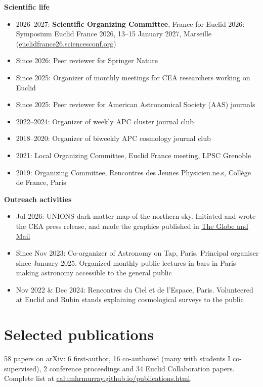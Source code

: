 \documentclass[11pt]{article}
\begin{document}
\textbf{Scientific life}
\begin{itemize}[leftmargin=1.5em, itemsep=0.2em]
\item 2026--2027: \textbf{Scientific Organizing Committee}, France for Euclid 2026: Symposium Euclid France 2026, 13--15 January 2027, Marseille (\href{https://euclidfrance26.sciencesconf.org/}{euclidfrance26.sciencesconf.org})
\item Since 2026: Peer reviewer for Springer Nature
\item Since 2025: Organizer of monthly meetings for CEA researchers working on Euclid
\item Since 2025: Peer reviewer for American Astronomical Society (AAS) journals
\item 2022--2024: Organizer of weekly APC cluster journal club
\item 2018--2020: Organizer of biweekly APC cosmology journal club
\item 2021: Local Organizing Committee, Euclid France meeting, LPSC Grenoble
\item 2019: Organizing Committee, Rencontres des Jeunes Physicien.ne.s, Collège de France, Paris
\end{itemize}

\textbf{Outreach activities}
\begin{itemize}[leftmargin=1.5em, itemsep=0.2em]
\item Jul 2026: UNIONS dark matter map of the northern sky. Initiated and wrote the CEA press release, and made the graphics published in \href{https://www.theglobeandmail.com/canada/science/article-scientists-produce-map-of-dark-matter-in-northern-skies/}{The Globe and Mail}
\item Since Nov 2023: Co-organizer of Astronomy on Tap, Paris. Principal organiser since January 2025. Organized monthly public lectures in bars in Paris making astronomy accessible to the general public
\item Nov 2022 \& Dec 2024: Rencontres du Ciel et de l'Espace, Paris. Volunteered at Euclid and Rubin stands explaining cosmological surveys to the public
\end{itemize}

\section*{Selected publications}

58 papers on arXiv: 6 first-author, 16 co-authored (many with students I co-supervised), 2 conference proceedings and 34 Euclid Collaboration papers. Complete list at \href{https://calumhrmurray.github.io/publications.html}{calumhrmurray.github.io/publications.html}.
\end{document}
